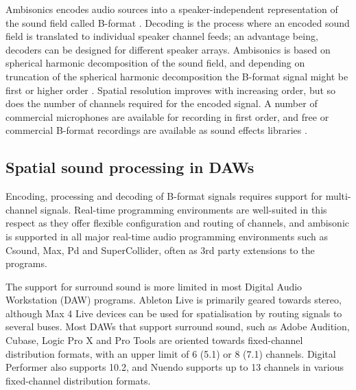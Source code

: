 \documentclass{article}
\begin{document}
Ambisonics encodes audio sources into a speaker-inde\-pendent representation of the sound field called B-format  \cite{gerzon:1985JAES}. Decoding is the process where an encoded sound field is translated to individual speaker channel feeds; an advantage being,  decoders can be designed for different speak\-er arrays.
Ambisonics is based on spherical harmonic decomposition of the sound field, and depending on truncation of the spherical harmonic decomposition the B-for\-mat signal might be first or higher order \cite{daniel:2001phd}.
Spatial resolution improves with increasing order, but so does the number of channels required for the encoded signal.
A number of commercial microphones are available for recording in first order, and free or commercial B-format recordings are available as sound effects libraries \cite{farrar:1979soundfield,deleflie2014:ambisonia,darcourt:2014surlib}.




\subsection{Spatial sound processing in DAWs}\label{sec:daws}

Encoding, processing and decoding of B-format signals requires support for multi-channel signals.
Real-time programming environments are well-suited in this respect as they offer flexible configuration and routing of channels, and ambisonic is supported in all major real-time audio programming environments such as Csound, Max, Pd and SuperCollider, often as 3rd party extensions to the programs.

The support for surround sound is more limited in most Digital Audio Workstation (DAW) programs.
Ableton Live is primarily geared towards stereo, although Max 4 Live devices can be used for spatialisation by routing signals to several buses.
Most DAWs that support surround sound, such as Adobe Audition, Cubase, Logic Pro X and Pro Tools are oriented towards fixed-channel distribution formats, with an upper limit of 6 (5.1) or 8 (7.1) channels.
Digital Performer also supports 10.2, and Nuendo supports up to 13 channels in various fixed-channel distribution formats.
\end{document}
